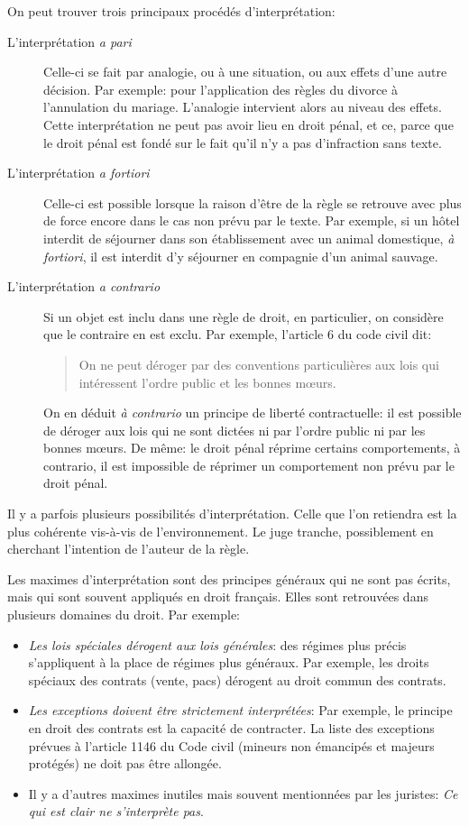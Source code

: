 \documentclass[math]{cours}
\begin{document}
On peut trouver trois principaux procédés d'interprétation:
\begin{description}
	\item[L'interprétation \textit{a pari}]
		Celle-ci se fait par analogie, ou à une situation, ou aux effets d'une autre décision.
		Par exemple: pour l'application des règles du divorce à l'annulation du mariage.
		L'analogie intervient alors au niveau des effets.
		Cette interprétation ne peut pas avoir lieu en droit pénal, et ce, parce que le droit pénal est fondé sur le fait qu'il n'y a pas d'infraction sans texte.

	\item[L'interprétation \textit{a fortiori}]
		Celle-ci est possible lorsque la raison d'être de la règle se retrouve avec plus de force encore dans le cas non prévu par le texte.
		Par exemple, si un hôtel interdit de séjourner dans son établissement avec un animal domestique, \textit{à fortiori}, il est interdit d'y séjourner en compagnie d'un animal sauvage.

	\item[L'interprétation \textit{a contrario}]
		Si un objet est inclu dans une règle de droit, en particulier, on considère que le contraire en est exclu.
		Par exemple, l'article 6 du code civil dit:
		\begin{quote}
			On ne peut déroger par des conventions particulières aux lois qui intéressent l'ordre public et les bonnes m\oe urs.
		\end{quote}
		On en déduit \textit{à contrario} un principe de liberté contractuelle: il est possible de déroger aux lois qui ne sont dictées ni par l'ordre public ni par les bonnes m\oe urs.
		De même: le droit pénal réprime certains comportements, à contrario, il est impossible de réprimer un comportement non prévu par le droit pénal.
\end{description}
Il y a parfois plusieurs possibilités d'interprétation.
Celle que l'on retiendra est la plus cohérente vis-à-vis de l'environnement.
Le juge tranche, possiblement en cherchant l'intention de l'auteur de la règle.

Les maximes d'interprétation sont des principes généraux qui ne sont pas écrits, mais qui sont souvent appliqués en droit français.
Elles sont retrouvées dans plusieurs domaines du droit.
Par exemple:
\begin{itemize}
	\item \textit{Les lois spéciales dérogent aux lois générales}: des régimes plus précis s'appliquent à la place de régimes plus généraux.
		Par exemple, les droits spéciaux des contrats (vente, pacs) dérogent au droit commun des contrats.
	\item \textit{Les exceptions doivent être strictement interprétées}:
		Par exemple, le principe en droit des contrats est la capacité de contracter.
		La liste des exceptions prévues à l'article 1146 du Code civil (mineurs non émancipés et majeurs protégés) ne doit pas être allongée.
	\item Il y a d'autres maximes inutiles mais souvent mentionnées par les juristes: \textit{Ce qui est clair ne s'interprète pas}.
\end{itemize}
\end{document}
